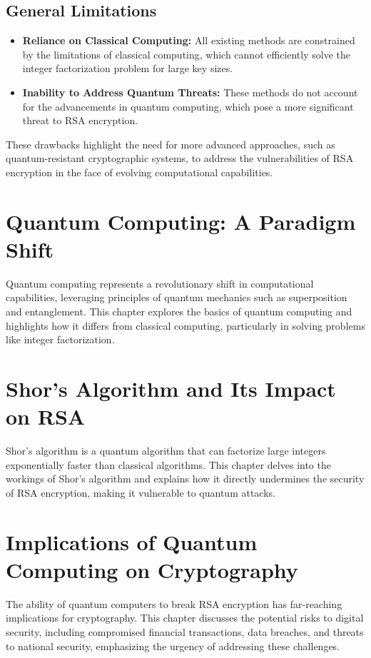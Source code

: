 \documentclass[12pt,a4paper]{report}
\begin{document}
\section{General Limitations}
\begin{itemize}
    \item \textbf{Reliance on Classical Computing:} All existing methods are constrained by the limitations of classical computing, which cannot efficiently solve the integer factorization problem for large key sizes.
    \item \textbf{Inability to Address Quantum Threats:} These methods do not account for the advancements in quantum computing, which pose a more significant threat to RSA encryption.
\end{itemize}

These drawbacks highlight the need for more advanced approaches, such as quantum-resistant cryptographic systems, to address the vulnerabilities of RSA encryption in the face of evolving computational capabilities.

\chapter{Quantum Computing: A Paradigm Shift}
Quantum computing represents a revolutionary shift in computational capabilities, leveraging principles of quantum mechanics such as superposition and entanglement. This chapter explores the basics of quantum computing and highlights how it differs from classical computing, particularly in solving problems like integer factorization.

\chapter{Shor's Algorithm and Its Impact on RSA}
Shor's algorithm is a quantum algorithm that can factorize large integers exponentially faster than classical algorithms. This chapter delves into the workings of Shor's algorithm and explains how it directly undermines the security of RSA encryption, making it vulnerable to quantum attacks.

\chapter{Implications of Quantum Computing on Cryptography}
The ability of quantum computers to break RSA encryption has far-reaching implications for cryptography. This chapter discusses the potential risks to digital security, including compromised financial transactions, data breaches, and threats to national security, emphasizing the urgency of addressing these challenges.
\end{document}
